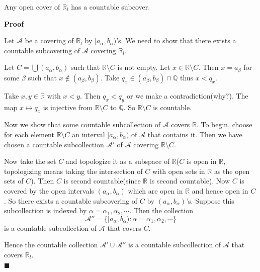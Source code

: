 \documentclass[main.tex]{subfiles}
\begin{document}
\begin{property}
    Any open cover of $\mathbb{R}_l$ has a countable subcover.
\end{property} 

\par \noindent \textbf{Proof} 
\par Let $\mathcal{A}$ be a covering of $\mathbb{R}_l$ by $[a_{\alpha}, b_{\alpha})$'s. We need to show that there exists a countable subcovering of $\mathcal{A}$ covering $\mathbb{R}_l$. 
\par Let $C = \bigcup(a_{\alpha}, b_{\alpha})$ such that $\mathbb{R}\setminus C$ is not empty. Let $x\in \mathbb{R}\setminus C$. Then $x = a_{\beta}$ for some $\beta$ such that $x\notin (a_{\beta}, b_{\beta})$. Take $q_x \in (a_{\beta}, b_{\beta}) \cap \mathbb{Q}$ thus $x < q_x$. 
\par Take $x, y\in \mathbb{R}$ with $x < y$. Then $q_x < q_y$ or we make a contradiction(why?). The map $x \mapsto q_x$ is injective from $\mathbb{R}\setminus C$ to $\mathbb{Q}$. So $\mathbb{R}\setminus C$ is countable. 
\par Now we show that some countable subcollection of $\mathcal{A}$ covers $\mathbb{R}$. To begin, choose for each element $\mathbb{R}\setminus C$ an interval $[a_{\alpha}, b_{\alpha})$ of $\mathcal{A}$ that contains it. Then we have chosen a countable subcollection $\mathcal{A}'$ of $\mathcal{A}$ covering $\mathbb{R}\setminus C$. 
\par Now take the set $C$ and topologize it as a subspace of $\mathbb{R}$($C$ is open in $\mathbb{R}$, topologizing means taking the intersection of $C$ with open sets in $\mathbb{R}$ as the open sets of $C$). Then $C$ is second countable(since $\mathbb{R}$ is second countable). Now $C$ is covered by the open intervals $(a_{\alpha}, b_{\alpha})$ which are open in $\mathbb{R}$ and hence open in $C$. So there exists a countable subcovering of $C$ by $(a_{\alpha}, b_{\alpha})$'s. Suppose this subcollection is indexed by $\alpha = \alpha_1, \alpha_2, \cdots$. Then the collection 
\begin{equation}
    \mathcal{A}'' = \{[a_{\alpha}, b_{\alpha}): \alpha = \alpha_1, \alpha_2, \cdots\}
\end{equation}
is a countable subcollection of $\mathcal{A}$ that covers $C$. 
\par Hence the countable collection $\mathcal{A}' \cup \mathcal{A}''$ is a countable subcollection of $\mathcal{A}$ that covers $\mathbb{R}_l$. 
\mbox{} \\ \null \hfill $\blacksquare$ 
\end{document}
